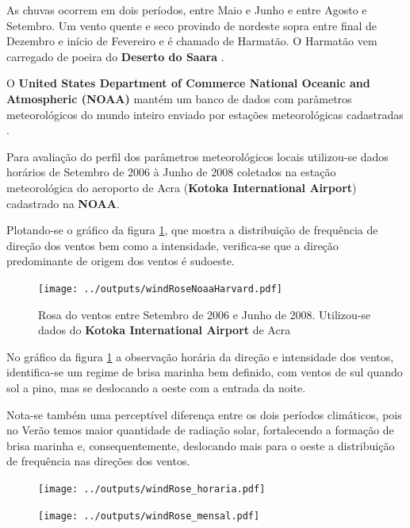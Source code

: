 As chuvas ocorrem em dois períodos, entre Maio e Junho e entre Agosto e Setembro.
Um vento quente e seco provindo de nordeste sopra entre final de Dezembro
e início de Fevereiro e é chamado de Harmatão. O Harmatão vem carregado de 
poeira do \textbf{Deserto do Saara} \citep{breuning2005}.

O \textbf{United States Department of Commerce National Oceanic 
and Atmospheric (NOAA)} mantém um banco de dados com parâmetros 
meteorológicos do mundo inteiro enviado por estações meteorológicas 
cadastradas \citep{noaa}. 

Para avaliação do perfil dos parâmetros meteorológicos locais
utilizou-se dados horários de Setembro de 2006 à Junho de 2008 
coletados na estação meteorológica do aeroporto de Acra 
(\textbf{Kotoka International Airport}) cadastrado na \textbf{NOAA}.

Plotando-se o gráfico da figura \ref{fg:rosaCompleta}, 
que mostra a distribuição de frequência de direção dos ventos bem como a 
intensidade, verifica-se que a direção predominante de origem dos ventos 
é sudoeste. 

\begin{figure}[H]
  \centering
  \texttt{[image: ../outputs/windRoseNoaaHarvard.pdf]}
  \caption{Rosa do ventos entre
           Setembro de 2006 e Junho de 2008. Utilizou-se dados 
           do \textbf{Kotoka International Airport} de Acra \label{fg:rosaCompleta}}
\end{figure}

No gráfico da figura \ref{fg:rosaCompleta} a observação horária da direção e 
intensidade dos ventos, identifica-se um regime de brisa marinha bem 
definido, com ventos de sul quando sol a pino, mas se deslocando a oeste com a 
entrada da noite. 

Nota-se também uma perceptível diferença entre os dois períodos climáticos, 
pois no Verão temos maior quantidade de radiação solar, fortalecendo a 
formação de brisa marinha e, consequentemente, deslocando mais para o 
oeste a distribuição de frequência nas direções dos ventos.
\begin{figure}[H]
  \centering
  \texttt{[image: ../outputs/windRose\_horaria.pdf]}
  \caption{ \citep{carslaw2012} \label{fig:windRose_horaria}}
\end{figure}

\begin{figure}[H]
  \centering
  \texttt{[image: ../outputs/windRose\_mensal.pdf]}
  \caption{ \citep{carslaw2012} \label{fig:windRose_mensal}}
\end{figure}

